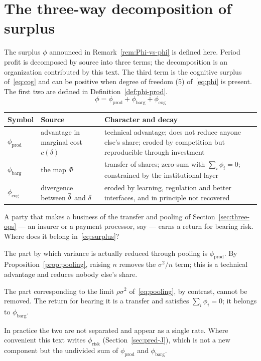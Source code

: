 \section{The three-way decomposition of surplus}
\label{sec:surplus-decomp}

The surplus $\phi$ announced in Remark~\ref{rem:Phi-vs-phi} is defined here. Period profit
is decomposed by source into three terms; the decomposition is an organization contributed
by this text. The third term is the cognitive surplus of~\eqref{eq:cog} and can be positive
when degree of freedom (5) of~\eqref{eq:phi} is present. The first two are defined in
Definition~\ref{def:phi-prod}.
\begin{equation}
\phi = \phi_{\mathrm{prod}} + \phi_{\mathrm{barg}} + \phi_{\mathrm{cog}}
\label{eq:surplus}
\end{equation}

\begin{center}
\begin{tabularx}{\textwidth}{@{}llX@{}}
\toprule
Symbol & Source & Character and decay \\
\midrule
$\phi_{\mathrm{prod}}$ & advantage in marginal cost $c(\delta)$ & technical advantage; does not reduce anyone else's share; eroded by competition but reproducible through investment \\
$\phi_{\mathrm{barg}}$ & the map $\Phi$ & transfer of shares; zero-sum with $\sum_i \phi_i = 0$; constrained by the institutional layer \\
$\phi_{\mathrm{cog}}$ & divergence between $\dbar$ and $\delta$ & eroded by learning, regulation and better interfaces, and in principle not recovered \\
\bottomrule
\end{tabularx}
\label{tab:surplus-decomposition}
\end{center}

\begin{remark}
\label{rem:phi-risk}
A party that makes a business of the transfer and pooling of Section~\ref{sec:three-ops} ---
an insurer or a payment processor, say --- earns a return for bearing risk. Where does it
belong in~\eqref{eq:surplus}?

The part by which variance is actually reduced through pooling is $\phi_{\mathrm{prod}}$.
By Proposition~\ref{prop:pooling}, raising $n$ removes the $\sigma^2/n$ term; this is a
technical advantage and reduces nobody else's share.

The part corresponding to the limit $\rho\sigma^2$ of~\eqref{eq:pooling}, by contrast,
cannot be removed. The return for bearing it is a transfer and satisfies
$\sum_i\phi_i=0$; it belongs to $\phi_{\mathrm{barg}}$.

In practice the two are not separated and appear as a single rate. Where convenient this
text writes $\phi_{\mathrm{risk}}$ (Section~\ref{sec:pred-J}), which is not a new component
but the undivided sum of $\phi_{\mathrm{prod}}$ and $\phi_{\mathrm{barg}}$.
\end{remark}

